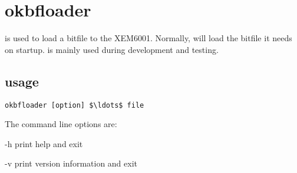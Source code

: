 \section{okbfloader}

 is used to load a bitfile to the XEM6001.
Normally,  will load the bitfile it needs on startup.
 is mainly used during development and testing.

\subsection{usage}

\begin{lstlisting}[mathescape=true]
okbfloader [option] $\ldots$ file
\end{lstlisting}
The command line options are:
\begin{description*}
	\item[-h]	print help and exit
	\item[-v]	print version information and exit
\end{description*}

